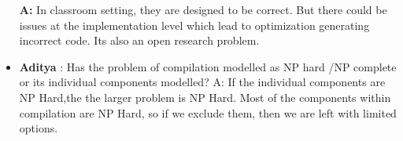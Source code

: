 \begin{itemize}
    \textbf{A:} In classroom setting, they are designed to be correct. But there could be issues at the implementation level which lead to optimization generating incorrect code. Its also an open research problem. 
    
    \item \textbf{Aditya} : Has the problem of compilation modelled as NP hard /NP complete or its individual components modelled?
    A: If the individual components are NP Hard,the the larger problem is NP Hard. Most of the components within compilation are NP Hard, so if we exclude them, then we are left with limited options.
    
    
\end{itemize}
